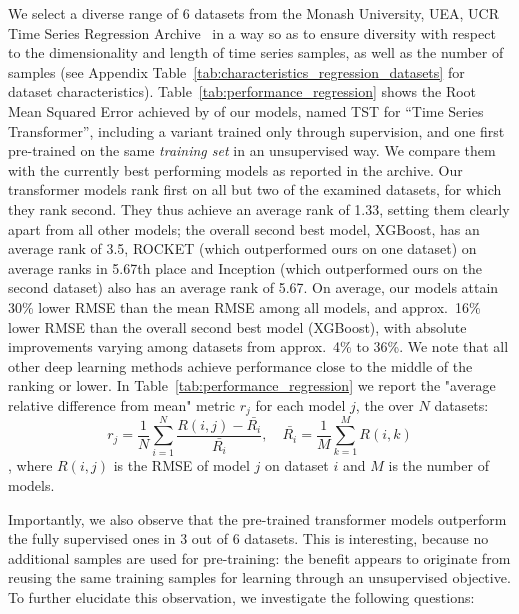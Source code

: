 \documentclass{article} \usepackage{iclr2021_conference,times}
\begin{document}
We select a diverse range of 6 datasets from the Monash University, UEA, UCR Time Series Regression Archive~\cite{regression_monash_2020} in a way so as to ensure diversity with respect to the dimensionality and length of time series samples, as well as the number of samples (see Appendix Table~\ref{tab:characteristics_regression_datasets} for dataset characteristics). Table~\ref{tab:performance_regression} shows the Root Mean Squared Error achieved by of our models, named TST for ``Time Series Transformer'', including a variant trained only through supervision, and one first pre-trained on the same \textit{training set} in an unsupervised way. We compare them with the currently best performing models as reported in the archive. Our transformer models rank first on all but two of the examined datasets, for which they rank second. They thus achieve an average rank of 1.33, setting them clearly apart from all other models; the overall second best model, XGBoost, has an average rank of 3.5, ROCKET (which outperformed ours on one dataset) on average ranks in 5.67th place and Inception (which outperformed ours on the second dataset) also has an average rank of 5.67. On average, our models attain 30\% lower RMSE than the mean RMSE among all models, and approx.\ 16\% lower RMSE than the overall second best model (XGBoost), with absolute improvements varying among datasets from approx.\ 4\% to 36\%. We note that all other deep learning methods achieve performance close to the middle of the ranking or lower. In Table~\ref{tab:performance_regression} we report the "average relative difference from mean" metric $r_j$ for each model $j$, the  over $N$ datasets: $$ r_j = \dfrac{1}{N}\sum_{i=1}^{N}\dfrac{R(i,j)-\bar{R_i}}{\bar{R_i}}, \quad \bar{R_i} = \dfrac{1}{M}\sum_{k=1}^{M} R(i,k)$$, where $R(i,j)$ is the RMSE of model $j$ on dataset $i$ and $M$ is the number of models.

Importantly, we also observe that the pre-trained transformer models outperform the fully supervised ones in 3 out of 6 datasets. This is interesting, because no additional samples are used for pre-training: the benefit appears to originate from reusing the same training samples for learning through an unsupervised objective. To further elucidate this observation, we investigate the following questions:
\end{document}

